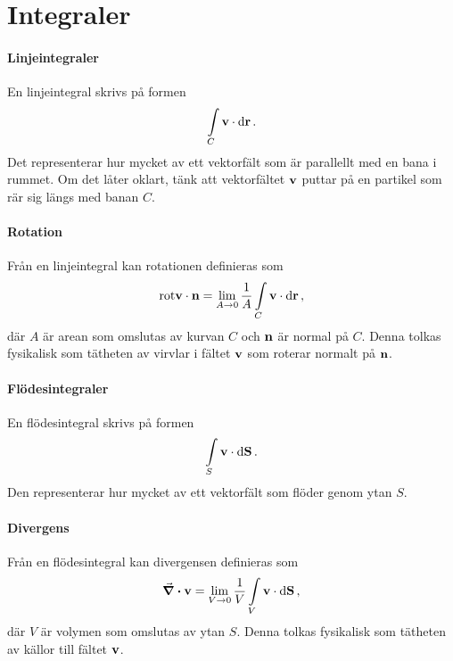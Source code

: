 \section{Integraler}

\paragraph{Linjeintegraler}
En linjeintegral skrivs på formen
\begin{align*}
	\int\limits_{C}\vb{v}\cdot\dd{\vb{r}}.
\end{align*}
Det representerar hur mycket av ett vektorfält som är parallellt med en bana i rummet. Om det låter oklart, tänk att vektorfältet $\vb{v}$ puttar på en partikel som rär sig längs med banan $C$.

\paragraph{Rotation}
Från en linjeintegral kan rotationen definieras som
\begin{align*}
	\text{rot}\vb{v}\cdot\vb{n} = \lim\limits_{A\to 0}\frac{1}{A}\int\limits_{C}\vb{v}\cdot\dd{\vb{r}},
\end{align*}
där $A$ är arean som omslutas av kurvan $C$ och $\vb{n}$ är normal på $C$. Denna tolkas fysikalisk som tätheten av virvlar i fältet $\vb{v}$ som roterar normalt på $\vb{n}$.

\paragraph{Flödesintegraler}
En flödesintegral skrivs på formen
\begin{align*}
	\int\limits_{S}\vb{v}\cdot\dd{\vb{S}}.
\end{align*}
Den representerar hur mycket av ett vektorfält som flöder genom ytan $S$.

\paragraph{Divergens}
Från en flödesintegral kan divergensen definieras som
\begin{align*}
	\div{\vb{v}} = \lim\limits_{V\to 0}\frac{1}{V}\int\limits_{V}\vb{v}\cdot\dd{\vb{S}},
\end{align*}
där $V$ är volymen som omslutas av ytan $S$. Denna tolkas fysikalisk som tätheten av källor till fältet $\vb{v}$.